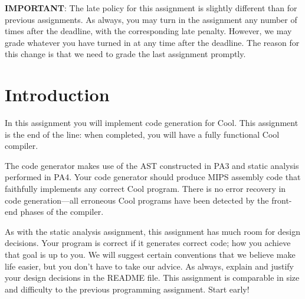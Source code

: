 %
%


\newcommand{\attr}[3]{#1:#2\leftarrow#3}
\newcommand{\classmap}[2]{class(#1) = (#2)}
\newcommand{\ossimple}[6]{#1,#2,#3\vdash #4 : #5,#6}
\newcommand{\osrule}[8]{\frac{#7}{\ossimple{#1}{#2}{#3}{#4}{#5}{#6}}\eqno
\mbox{#8}}
\def\U#1{{\sf{}#1}}
\def\S#1{{\tt{}#1}} %
\def\C#1{{\bf{}#1}}
\newcommand{\dq}{\mbox{\tt "}}




{\bf IMPORTANT}: The late
policy for this assignment is slightly different than for previous
assignments.  As always, you may turn in the assignment any number of
times after the deadline, with the corresponding late penalty.  However, we may grade
whatever you have turned in at any time after the deadline.
The reason for this change is that we need to grade the
last assignment promptly.

\section{Introduction}

In this assignment you will implement code generation for Cool.
This assignment is the end of the line: when completed, you will
have a fully functional Cool compiler.

The code generator makes use of the AST constructed in PA3
and static analysis performed in PA4.  Your code generator should
produce MIPS assembly code that faithfully implements any correct
Cool program.  There is no error recovery in code generation---all
erroneous Cool programs have been detected by the front-end phases
of the compiler.

As with the static analysis assignment, this assignment has much
room for design decisions.  Your program is correct if it generates
correct code; how you achieve that goal is up to you.  We will suggest
certain conventions that we believe make life easier, but you don't
have to take our advice.  As always, explain and justify your design
decisions in the \U{README} file.
This assignment is comparable in size and difficulty to the previous
programming assignment.  Start early!

